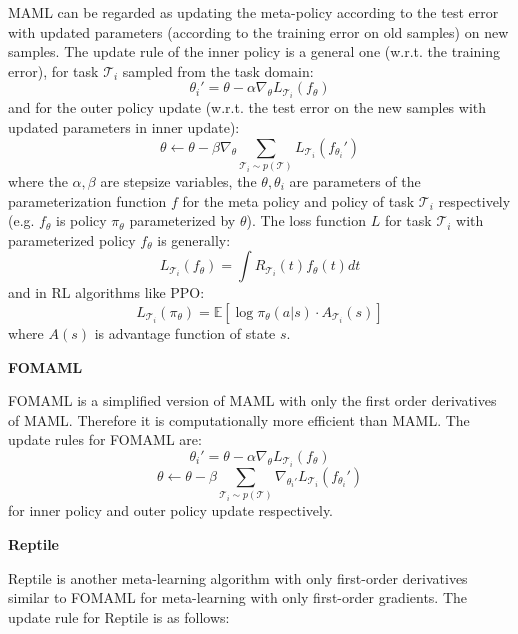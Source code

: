 \documentclass{article}
\begin{document}
MAML can be regarded as updating the meta-policy according to the test error with updated parameters (according to the training error on old samples) on new samples. The update rule of the inner policy is a general one (w.r.t. the training error), for task $\mathcal{T}_i$ sampled from the task domain:
\begin{equation}
    \theta_i' = \theta - \alpha \nabla_{\theta}L_{\mathcal{T}_i}(f_{\theta})
\end{equation}
and for the outer policy update (w.r.t. the test error on the new samples with updated parameters in inner update):
\begin{equation}
\label{equ:maml_update}
    \theta \leftarrow \theta - \beta\nabla_{\theta}\sum_{\mathcal{T}_i\sim p(\mathcal{T})}L_{\mathcal{T}_i}(f_\theta_i')
\end{equation}
where the $\alpha, \beta$ are stepsize variables, the $\theta, \theta_i$ are parameters of the parameterization function $f$ for the meta policy and policy of task $\mathcal{T}_i$ respectively (e.g. $f_\theta$ is policy $\pi_\theta$ parameterized by $\theta$). 
The loss function $L$ for task $\mathcal{T}_i$ with parameterized policy $f_\theta$ is generally:
\begin{equation}
    L_{\mathcal{T}_i}(f_\theta) =\int R_{\mathcal{T}_i}(t) f_\theta(t) dt
\end{equation}
and in RL algorithms like PPO:
\begin{equation}
\label{equ:1}
     L_{\mathcal{T}_i}(\pi_\theta) = \mathbb{E}[\log \pi_\theta(a|s)\cdot A_{\mathcal{T}_i}(s)]
\end{equation}
where $A(s)$ is advantage function of state $s$.

\textbf{FOMAML}

FOMAML is a simplified version of MAML with only the first order derivatives of MAML. Therefore it is computationally more efficient than MAML. The update rules for FOMAML are:
\begin{equation}
    \theta_i' = \theta - \alpha \nabla_{\theta}L_{\mathcal{T}_i}(f_{\theta})
\end{equation}
\begin{equation}
    \theta \leftarrow \theta - \beta\sum_{\mathcal{T}_i\sim p(\mathcal{T})} \nabla_{\theta_i'}L_{\mathcal{T}_i}(f_\theta_i')
\end{equation}
for inner policy and outer policy update respectively.

\textbf{Reptile}

Reptile \cite{nichol2018first} is another meta-learning algorithm with only first-order derivatives similar to FOMAML for meta-learning with only first-order gradients. The update rule for Reptile is as follows:
\end{document}

